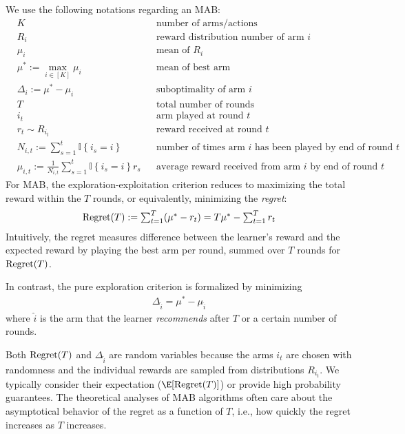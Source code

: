 We use the following notations regarding an MAB:
\begin{align*}
    &K    && \text{number of arms/actions}\\
    &R_i  && \text{reward distribution number of arm $i$}\\
    &\mu_i && \text{mean of $R_i$}\\
    &\mu^* := \textstyle \max_{i\in[K]}\mu_i && \text{mean of best arm}\\
    &\Delta_i := \mu^* - \mu_i && \text{suboptimality of arm $i$}\\
    &T    && \text{total number of rounds}\\
    &i_t    && \text{arm played at round $t$}\\
    &r_t\sim R_{i_t}    && \text{reward received at round $t$}\\ 
    &N_{i,t}:=\textstyle\sum_{s=1}^t \mathbb{I}\left\{i_s=i\right\}    && \text{number of times arm $i$ has been played by end of round $t$}\\
    &\hat{\mu}_{i,t}:=\tfrac{1}{N_{i,t}} \textstyle\sum_{s=1}^t \mathbb{I}\left\{i_s=i\right\} r_s    && \text{average reward received from arm $i$ by end of round $t$}
\end{align*}
For MAB, the exploration-exploitation criterion reduces to maximizing the total reward within the $T$ rounds, or equivalently, minimizing the {\em regret}:
\begin{align}
\label{eq:regret}
\operatorname{Regret}(T) :=  \textstyle\sum_{t=1}^T (\mu^*-r_t) =T\mu^* - \textstyle\sum_{t=1}^Tr_t
\end{align}
Intuitively, the regret measures difference between the learner's reward and the expected reward by playing the best arm per round, summed over $T$ rounds for $\operatorname{Regret}(T)$.

In contrast, the pure exploration criterion is formalized by minimizing
\begin{align*}
\Delta_{\hat{i}} = \mu^{*}-\mu_{\hat{i}}
\end{align*}
where $\hat{i}$ is the arm that the learner {\em recommends} after $T$ or a certain number of rounds.

Both $\operatorname{Regret}(T)$ and $\Delta_{\hat{i}}$ are random variables because the arms $i_t$ are chosen with randomness and the individual rewards are sampled from distributions $R_{i_t}$. 
We typically consider their expectation ($\E[\Regret(T)]$) or provide high probability guarantees.
The theoretical analyses of MAB algorithms often care about the asymptotical behavior of the regret as a function of $T$, i.e., how quickly the regret increases as $T$ increases.

